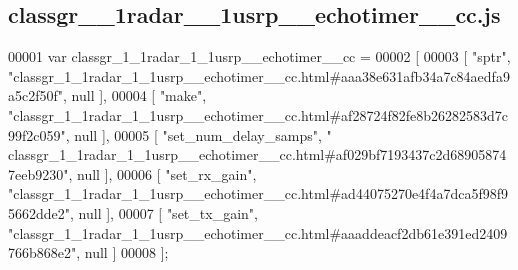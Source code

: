 \subsection{classgr\+\_\+\_\+1radar\+\_\+\_\+1usrp\+\_\+\+\_\+echotimer\+\_\+\+\_\+cc.\+js}
\label{classgr__1__1radar__1__1usrp____echotimer____cc_8js_source}

\begin{DoxyCode}
00001 var classgr_1_1radar_1_1usrp__echotimer__cc =
00002 [
00003     [ \textcolor{stringliteral}{"sptr"}, \textcolor{stringliteral}{"classgr\_1\_1radar\_1\_1usrp\_\_echotimer\_\_cc.html#aaa38e631afb34a7c84aedfa9a5c2f50f"}, null ],
00004     [ \textcolor{stringliteral}{"make"}, \textcolor{stringliteral}{"classgr\_1\_1radar\_1\_1usrp\_\_echotimer\_\_cc.html#af28724f82fe8b26282583d7c99f2c059"}, null ],
00005     [ \textcolor{stringliteral}{"set\_num\_delay\_samps"}, \textcolor{stringliteral}{"
      classgr\_1\_1radar\_1\_1usrp\_\_echotimer\_\_cc.html#af029bf7193437c2d689058747eeb9230"}, null ],
00006     [ \textcolor{stringliteral}{"set\_rx\_gain"}, \textcolor{stringliteral}{"classgr\_1\_1radar\_1\_1usrp\_\_echotimer\_\_cc.html#ad44075270e4f4a7dca5f98f95662dde2"}, null
       ],
00007     [ \textcolor{stringliteral}{"set\_tx\_gain"}, \textcolor{stringliteral}{"classgr\_1\_1radar\_1\_1usrp\_\_echotimer\_\_cc.html#aaaddeacf2db61e391ed2409766b868e2"}, null
       ]
00008 ];
\end{DoxyCode}
